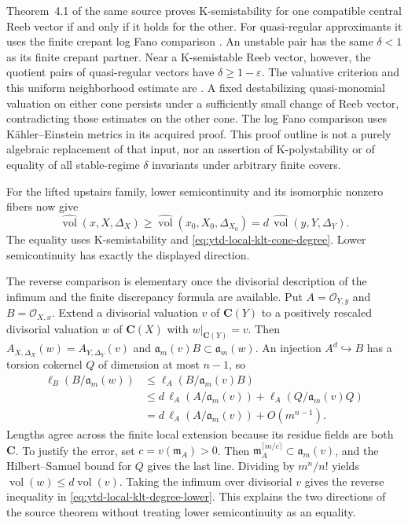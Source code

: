 Theorem~4.1 of the same source proves K-semistability for one
compatible central Reeb vector if and only if it holds for
the other. For quasi-regular approximants it uses the finite
crepant log Fano comparison
\cite[Theorem~1.2(1),(3)]{LiuZhu20EquivariantV1}.
An unstable pair has the same $\delta<1$ as its finite
crepant partner. Near a K-semistable Reeb vector, however,
the quotient pairs of quasi-regular vectors have
$\delta\geq1-\varepsilon$. The valuative criterion and
this uniform neighborhood estimate are
\cite[Lemmas~2.18--2.19]{XuZhuang26StableFormsV2}.
A fixed destabilizing quasi-monomial valuation on either
cone persists under a sufficiently small change of Reeb
vector, contradicting those estimates on the other cone.
The log Fano comparison uses K\"ahler--Einstein metrics
in its acquired proof. This proof outline is not a purely
algebraic replacement of that input, nor an assertion of
K-polystability or of equality of all stable-regime
$\delta$ invariants under arbitrary finite covers.

For the lifted upstairs family, lower semicontinuity
\cite[Theorems~1 and~28]{BlumLiu19LowerSemiV2} and
its isomorphic nonzero fibers now give
\[
\tag{68.23bg}\label{eq:ytd-local-klt-degree-lower}
 \widehat{\operatorname{vol}}(x,X,\Delta_X)
 \geq\widehat{\operatorname{vol}}(x_0,X_0,\Delta_{X_0})
 =d\,\widehat{\operatorname{vol}}(y,Y,\Delta_Y).
\]
The equality uses K-semistability and
\eqref{eq:ytd-local-klt-cone-degree}. Lower semicontinuity
has exactly the displayed direction.

The reverse comparison is elementary once the divisorial
description of the infimum and the finite discrepancy formula
are available. Put $A=\mathcal O_{Y,y}$ and
$B=\mathcal O_{X,x}$. Extend a divisorial valuation $v$
of $\mathbf C(Y)$ to a positively rescaled divisorial
valuation $w$ of $\mathbf C(X)$ with $w|_{\mathbf C(Y)}=v$.
Then $A_{X,\Delta_X}(w)=A_{Y,\Delta_Y}(v)$ and
$\mathfrak a_m(v)B\subset\mathfrak a_m(w)$.
An injection $A^d\hookrightarrow B$ has a torsion
cokernel $Q$ of dimension at most $n-1$, so
\[
\tag{68.23bh}\label{eq:ytd-local-klt-degree-length}
\begin{aligned}
 \ell_B(B/\mathfrak a_m(w))
 &\leq\ell_A(B/\mathfrak a_m(v)B)\\
 &\leq d\,\ell_A(A/\mathfrak a_m(v))
                  +\ell_A(Q/\mathfrak a_m(v)Q)\\
 &=d\,\ell_A(A/\mathfrak a_m(v))+O(m^{n-1}).
\end{aligned}
\]
Lengths agree across the finite local extension because its
residue fields are both $\mathbf C$. To justify the error,
set $c=v(\mathfrak m_A)>0$. Then
$\mathfrak m_A^{\lceil m/c\rceil}\subset\mathfrak a_m(v)$,
and the Hilbert--Samuel bound for $Q$ gives the last line.
Dividing by $m^n/n!$ yields
$\operatorname{vol}(w)\leq d\operatorname{vol}(v)$.
Taking the infimum over divisorial $v$ gives the reverse
inequality in \eqref{eq:ytd-local-klt-degree-lower}.
This explains the two directions of the source theorem
without treating lower semicontinuity as an equality.

